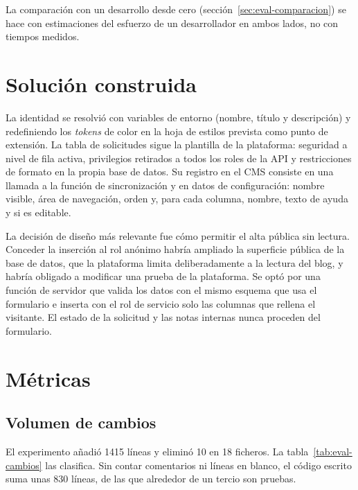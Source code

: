La comparación con un desarrollo desde cero
(sección~\ref{sec:eval-comparacion}) se hace con estimaciones del esfuerzo
de un desarrollador en ambos lados, no con tiempos medidos.

\section{Solución construida}
\label{sec:eval-solucion}

La identidad se resolvió con variables de entorno (nombre, título y
descripción) y redefiniendo los \emph{tokens} de color en la hoja de estilos
prevista como punto de extensión. La tabla de solicitudes sigue la plantilla
de la plataforma: seguridad a nivel de fila activa, privilegios retirados a
todos los roles de la API y restricciones de formato en la propia base de
datos. Su registro en el CMS consiste en una llamada a la función de
sincronización y en datos de configuración: nombre visible, área de
navegación, orden y, para cada columna, nombre, texto de ayuda y si es
editable.

La decisión de diseño más relevante fue cómo permitir el alta pública sin
lectura. Conceder la inserción al rol anónimo habría ampliado la superficie
pública de la base de datos, que la plataforma limita deliberadamente a la
lectura del blog, y habría obligado a modificar una prueba de la plataforma.
Se optó por una función de servidor que valida los datos con el mismo
esquema que usa el formulario e inserta con el rol de servicio solo las
columnas que rellena el visitante. El estado de la solicitud y las notas
internas nunca proceden del formulario.

\section{Métricas}
\label{sec:eval-metricas}

\subsection{Volumen de cambios}

El experimento añadió 1415 líneas y eliminó 10 en 18 ficheros. La
tabla~\ref{tab:eval-cambios} las clasifica. Sin contar comentarios ni líneas
en blanco, el código escrito suma unas 830 líneas, de las que alrededor de un
tercio son pruebas.

